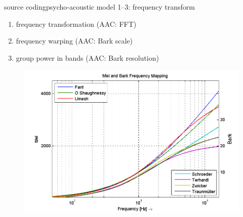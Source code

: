 	\begin{frame}{source coding}{psycho-acoustic model 1--3: frequency transform}
		\begin{enumerate}
            \item   frequency transformation (AAC: FFT)
            \item   frequency warping (AAC: Bark scale)
            \item   group power in bands (AAC:  Bark resolution)
        \end{enumerate}
            \begin{figure}
				\centering
					\includegraphics[scale=0.5]{Graph/mel}
			\end{figure}
	\end{frame}
	

